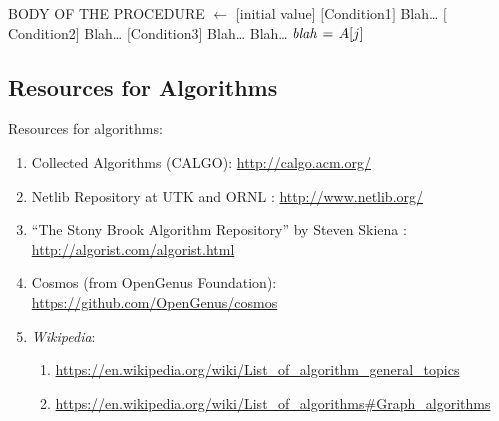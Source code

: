 \begin{codebox}
\label{lst:MyAlgorithm}
\zi {}
\zi {}
\li BODY OF THE PROCEDURE
\zi {}
\li \While [condition]
	\Do
\li	[Something]
	\End
\zi {}
\li \For {} $\gets$ [initial value] 
	\Do
\li	[Something]
	\End
\zi {}
\li	\If $[$Condition1$]$
	\Then
\li		Blah\dots
\li	\ElseIf $[$Condition2$]$
	\Then
\li		Blah\dots
\li	\ElseIf $[$Condition3$]$
	\Then
\li		Blah\dots
\li	\Else
\li		Blah\dots	
	\End
\zi {}
\li $\id{blah} \gets A[j]$
\zi	\>	
\zi	{}
\li	\Return
\end{codebox}



\subsection{Resources for Algorithms}
\label{ssec:ResourcesForAlgorithms}

Resources for algorithms: \vspace{-0.3cm}
\begin{enumerate} \itemsep -4pt
\item Collected Algorithms (CALGO): \url{http://calgo.acm.org/}
\item Netlib Repository at UTK and ORNL \cite{Dongarra2016}: \url{http://www.netlib.org/}
\item ``The Stony Brook Algorithm Repository'' by Steven Skiena \cite{Skiena2008}: \url{http://algorist.com/algorist.html}
\item Cosmos (from OpenGenus Foundation): \url{https://github.com/OpenGenus/cosmos}
\item {\it Wikipedia}: \vspace{-0.3cm}
	\begin{enumerate} \itemsep -2pt
	\item \url{https://en.wikipedia.org/wiki/List_of_algorithm_general_topics}
	\item \url{https://en.wikipedia.org/wiki/List_of_algorithms#Graph_algorithms}
	\end{enumerate}
\end{enumerate}











